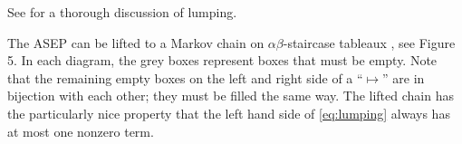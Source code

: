 \documentclass[11pt]{amsart}
\newtheorem{lemma}[theorem]{Lemma}
\theoremstyle{definition}
\theoremstyle{remark}
\begin{document}


See \cite{KemenySnell, Pang} for a thorough discussion of 
lumping.

The ASEP can be lifted to a Markov chain on $\alpha \beta$-staircase
tableaux \cite{CW2}, see Figure 5.  
In each diagram, the grey boxes
represent boxes that must be empty.  Note
that the 
remaining empty boxes on the left and right side of a ``$\mapsto$''
are in bijection with each other; they must be filled the 
same way.
The lifted chain has the 
particularly nice property that the left hand side of \eqref{eq:lumping} 
always has at most one nonzero term.

\end{document}
